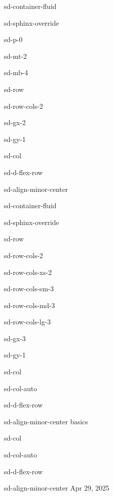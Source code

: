 \documentclass[letterpaper,10pt,english]{jupyterBook}
\begin{document}
\begin{sphinxuseclass}{sd-container-fluid}
\begin{sphinxuseclass}{sd-sphinx-override}
\begin{sphinxuseclass}{sd-p-0}
\begin{sphinxuseclass}{sd-mt-2}
\begin{sphinxuseclass}{sd-mb-4}
\begin{sphinxuseclass}{sd-row}
\begin{sphinxuseclass}{sd-row-cols-2}
\begin{sphinxuseclass}{sd-gx-2}
\begin{sphinxuseclass}{sd-gy-1}
\begin{sphinxuseclass}{sd-col}
\begin{sphinxuseclass}{sd-d-flex-row}
\begin{sphinxuseclass}{sd-align-minor-center}
\begin{sphinxuseclass}{sd-container-fluid}
\begin{sphinxuseclass}{sd-sphinx-override}
\begin{sphinxuseclass}{sd-row}
\begin{sphinxuseclass}{sd-row-cols-2}
\begin{sphinxuseclass}{sd-row-cols-xs-2}
\begin{sphinxuseclass}{sd-row-cols-sm-3}
\begin{sphinxuseclass}{sd-row-cols-md-3}
\begin{sphinxuseclass}{sd-row-cols-lg-3}
\begin{sphinxuseclass}{sd-gx-3}
\begin{sphinxuseclass}{sd-gy-1}
\begin{sphinxuseclass}{sd-col}
\begin{sphinxuseclass}{sd-col-auto}
\begin{sphinxuseclass}{sd-d-flex-row}
\begin{sphinxuseclass}{sd-align-minor-center}
\sphinxAtStartPar
basics

\end{sphinxuseclass}
\end{sphinxuseclass}
\end{sphinxuseclass}
\end{sphinxuseclass}
\begin{sphinxuseclass}{sd-col}
\begin{sphinxuseclass}{sd-col-auto}
\begin{sphinxuseclass}{sd-d-flex-row}
\begin{sphinxuseclass}{sd-align-minor-center}
\sphinxAtStartPar
Apr 29, 2025


\end{sphinxuseclass}
\end{sphinxuseclass}
\end{sphinxuseclass}
\end{sphinxuseclass}
\end{sphinxuseclass}
\end{sphinxuseclass}
\end{sphinxuseclass}
\end{sphinxuseclass}
\end{sphinxuseclass}
\end{sphinxuseclass}
\end{sphinxuseclass}
\end{sphinxuseclass}
\end{sphinxuseclass}
\end{sphinxuseclass}
\end{sphinxuseclass}
\end{sphinxuseclass}
\end{sphinxuseclass}
\end{sphinxuseclass}
\end{sphinxuseclass}
\end{sphinxuseclass}
\end{sphinxuseclass}
\end{sphinxuseclass}
\end{sphinxuseclass}
\end{sphinxuseclass}
\end{sphinxuseclass}
\end{sphinxuseclass}
\end{document}
